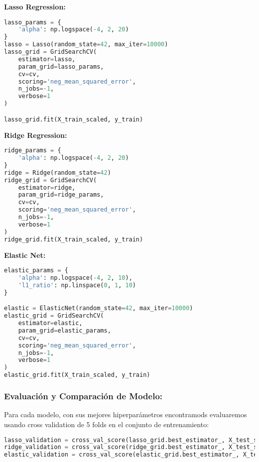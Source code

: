 \documentclass[12pt,a4paper]{article}
\begin{document}
\vspace{0.5cm}

\textbf{Lasso Regression:}

\begin{lstlisting}[language=Python, frame=single, basicstyle=\ttfamily\small, breaklines=true]
lasso_params = {
    'alpha': np.logspace(-4, 2, 20)
}
lasso = Lasso(random_state=42, max_iter=10000)
lasso_grid = GridSearchCV(
    estimator=lasso,
    param_grid=lasso_params,
    cv=cv,
    scoring='neg_mean_squared_error',
    n_jobs=-1,
    verbose=1
)

lasso_grid.fit(X_train_scaled, y_train)
\end{lstlisting}

\textbf{Ridge Regression:}
\begin{lstlisting}[language=Python, frame=single, basicstyle=\ttfamily\small, breaklines=true]
ridge_params = {
    'alpha': np.logspace(-4, 2, 20)
}
ridge = Ridge(random_state=42)
ridge_grid = GridSearchCV(
    estimator=ridge,
    param_grid=ridge_params,
    cv=cv,
    scoring='neg_mean_squared_error',
    n_jobs=-1,
    verbose=1
)
ridge_grid.fit(X_train_scaled, y_train)
\end{lstlisting}

\vspace{0.5cm}

\textbf{Elastic Net:}
\begin{lstlisting}[language=Python, frame=single, basicstyle=\ttfamily\small, breaklines=true]
elastic_params = {
    'alpha': np.logspace(-4, 2, 10),
    'l1_ratio': np.linspace(0, 1, 10)
}

elastic = ElasticNet(random_state=42, max_iter=10000)
elastic_grid = GridSearchCV(
    estimator=elastic,
    param_grid=elastic_params,
    cv=cv,
    scoring='neg_mean_squared_error',
    n_jobs=-1,
    verbose=1
)
elastic_grid.fit(X_train_scaled, y_train)
\end{lstlisting}

\subsubsection{Evaluación y Comparación de Modelo:}
Para cada modelo, con sus mejores hiperparámetros encontramods evaluaremos usando cross validation de 5 folds en el conjunto de entrenamiento:

\vspace{0.5cm}

\begin{lstlisting}[language=Python, frame=single, basicstyle=\ttfamily\small, breaklines=true]
lasso_validation = cross_val_score(lasso_grid.best_estimator_, X_test_scaled, y_test, cv=5, scoring='neg_mean_squared_error')
ridge_validation = cross_val_score(ridge_grid.best_estimator_, X_test_scaled, y_test, cv=5, scoring='neg_mean_squared_error')
elastic_validation = cross_val_score(elastic_grid.best_estimator_, X_test_scaled, y_test, cv=5, scoring='neg_mean_squared_error')
\end{lstlisting}
\end{document}
